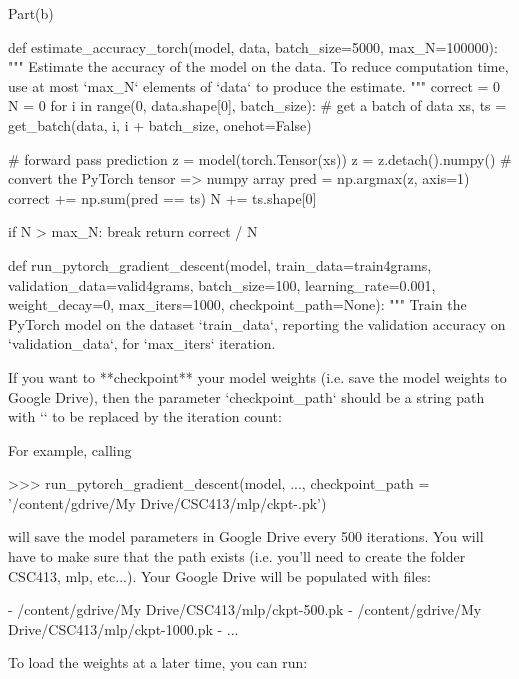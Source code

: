 \documentclass[12pt]{article}
\begin{document}
Part(b)\\
\begin{python}
def estimate_accuracy_torch(model, data, batch_size=5000, max_N=100000):
    """
    Estimate the accuracy of the model on the data. To reduce
    computation time, use at most `max_N` elements of `data` to
    produce the estimate.
    """
    correct = 0
    N = 0
    for i in range(0, data.shape[0], batch_size):
        # get a batch of data
        xs, ts = get_batch(data, i, i + batch_size, onehot=False)
        
        # forward pass prediction
        z = model(torch.Tensor(xs))
        z = z.detach().numpy() # convert the PyTorch tensor => numpy array
        pred = np.argmax(z, axis=1)
        correct += np.sum(pred == ts)
        N += ts.shape[0]

        if N > max_N:
            break
    return correct / N

def run_pytorch_gradient_descent(model,
                                 train_data=train4grams,
                                 validation_data=valid4grams,
                                 batch_size=100,
                                 learning_rate=0.001,
                                 weight_decay=0,
                                 max_iters=1000,
                                 checkpoint_path=None):
    """
    Train the PyTorch model on the dataset `train_data`, reporting
    the validation accuracy on `validation_data`, for `max_iters`
    iteration.

    If you want to **checkpoint** your model weights (i.e. save the
    model weights to Google Drive), then the parameter
    `checkpoint_path` should be a string path with `{}` to be replaced
    by the iteration count:

    For example, calling 

    >>> run_pytorch_gradient_descent(model, ...,
            checkpoint_path = '/content/gdrive/My Drive/CSC413/mlp/ckpt-{}.pk')

    will save the model parameters in Google Drive every 500 iterations.
    You will have to make sure that the path exists (i.e. you'll need to create
    the folder CSC413, mlp, etc...). Your Google Drive will be populated with files:

    - /content/gdrive/My Drive/CSC413/mlp/ckpt-500.pk
    - /content/gdrive/My Drive/CSC413/mlp/ckpt-1000.pk
    - ...

    To load the weights at a later time, you can run:


\end{python}
\end{document}
